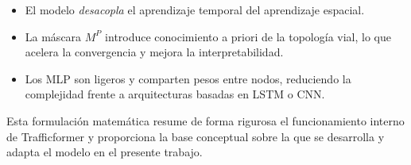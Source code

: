 \begin{itemize}
	\item El modelo \emph{desacopla} el aprendizaje temporal del aprendizaje espacial.
	\item La máscara $M^{P}$ introduce conocimiento a priori de la topología vial, lo que acelera la convergencia y mejora la interpretabilidad.
	\item Los MLP son ligeros y comparten pesos entre nodos, reduciendo la complejidad frente a arquitecturas basadas en LSTM o CNN.
\end{itemize}

\vspace{0.5cm}

Esta formulación matemática resume de forma rigurosa el funcionamiento interno de Trafficformer y proporciona la base conceptual sobre la que se desarrolla y adapta el modelo en el presente trabajo.
